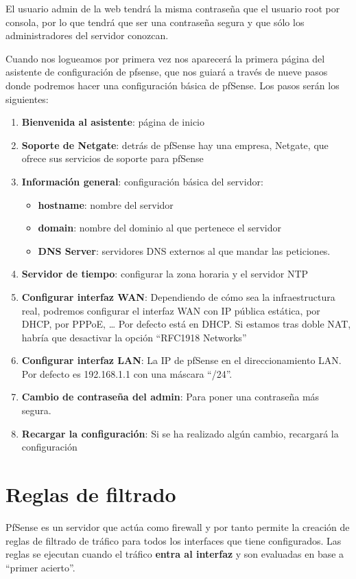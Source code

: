 El usuario admin de la web tendrá la misma contraseña que el usuario root por consola, por lo que tendrá que ser una contraseña segura y que sólo los administradores del servidor conozcan.

Cuando nos logueamos por primera vez nos aparecerá la primera página del asistente de configuración de pfsense, que nos guiará a través de nueve pasos donde podremos hacer una configuración básica de pfSense. Los pasos serán los siguientes:

\begin{enumerate}
    \setcounter{enumi}{0}
    \item \textbf{Bienvenida al asistente}: página de inicio
    \item \textbf{Soporte de Netgate}: detrás de pfSense hay una empresa, Netgate, que ofrece sus servicios de soporte para pfSense
    \item \textbf{Información general}: configuración básica del servidor:
    \begin{itemize}
        \item \textbf{hostname}: nombre del servidor
        \item \textbf{domain}: nombre del dominio al que pertenece el servidor
        \item \textbf{DNS Server}: servidores DNS externos al que mandar las peticiones.
    \end{itemize}
    \item \textbf{Servidor de tiempo}: configurar la zona horaria y el servidor NTP
    \item \textbf{Configurar interfaz WAN}: Dependiendo de cómo sea la infraestructura real, podremos configurar el interfaz WAN con IP pública estática, por DHCP, por PPPoE, … Por defecto está en DHCP. Si estamos tras doble NAT, habría que desactivar la opción “RFC1918 Networks”
    \item \textbf{Configurar interfaz LAN}: La IP de pfSense en el direccionamiento LAN. Por defecto es 192.168.1.1 con una máscara “/24”.
    \item \textbf{Cambio de contraseña del admin}: Para poner una contraseña más segura.
    \item \textbf{Recargar la configuración}: Si se ha realizado algún cambio, recargará la configuración
\end{enumerate}

\section{Reglas de filtrado}
PfSense es un servidor que actúa como firewall y por tanto permite la creación de reglas de filtrado de tráfico para todos los interfaces que tiene configurados. Las reglas se ejecutan cuando el tráfico \textbf{entra al interfaz} y son evaluadas en base a “primer acierto”.

